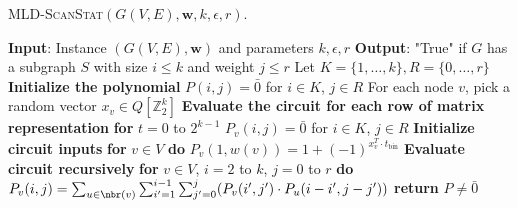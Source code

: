 \begin{algorithm}{}
\small
\caption{\small \textsc{MLD-ScanStat}$(G(V, E), \mathbf{w}, k, \epsilon, r)$.}
\label{alg:mld-scanstat}
\begin{algorithmic}[1]
\STATE \textbf{Input}: Instance $(G(V, E), \mathbf{w})$ and parameters $k, \epsilon, r$
\STATE\textbf{Output}: "True" if $G$ has a subgraph $S$ with size $i \leq k$ and weight $j \leq r$
\STATE Let $K=\{1,\ldots,k\}, R=\{0, \ldots, r\}$
\STATE \textbf{Initialize the polynomial}
\STATE $P(i, j) = \bar{0}$ for $i \in K$, $j \in R$
\STATE For each node $v$, pick a random vector $x_v \in Q[\mathbb{Z}_{2}^k]$
\STATE \textbf{Evaluate the circuit for each row of matrix representation}
\STATE \textbf{for} $t = 0$ to $2^{k-1}$
\STATE \quad $P_v(i, j) = \bar{0}$ for $i \in K$, $j \in R$
\STATE \quad \textbf{Initialize circuit inputs}
\STATE \quad \textbf{for} $v \in V$ \textbf{do}
\STATE \quad \quad $P_v(1, w(v)) = 1 + (-1)^{x_v^T \cdot t_{\text{bin}}}$
\STATE \quad \textbf{Evaluate circuit recursively}
\STATE \quad \textbf{for} $v \in V$, $i = 2$ to $k$, $j = 0$ to $r$ \textbf{do}
\STATE \qquad $P_v(i,j) = \sum_{u \in \nbr(v)} \sum_{i' = 1}^{i-1}\sum_{j'=0}^j (P_v(i', j') \cdot P_u(i-i', j - j'))$ 
\STATE
\STATE \textbf{return} $P \neq \bar 0$
\end{algorithmic}
\end{algorithm}


